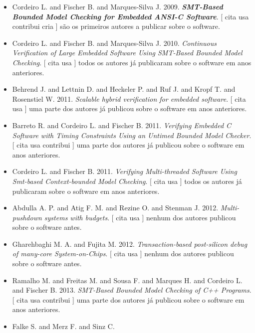 \begin{itemize}
\item Cordeiro L. and Fischer B. and Marques-Silva J.
      2009.
        \textbf{\textit{ SMT-Based Bounded Model Checking for Embedded ANSI-C Software}}.
      [
          cita
          usa
          contribui
          cria
      ]
são os primeiros autores a publicar sobre o software.
\item Cordeiro L. and Fischer B. and Marques-Silva J.
      2010.
        \textit{ Continuous Verification of Large Embedded Software Using SMT-Based Bounded Model Checking}.
      [
          cita
          usa
      ]
todos os autores já publicaram sobre o software em anos anteriores.
\item Behrend J. and Lettnin D. and Heckeler P. and Ruf J. and Kropf T. and Rosenstiel W.
      2011.
        \textit{ Scalable hybrid verification for embedded software}.
      [
          cita
          usa
      ]
uma parte dos autores já publicou sobre o software em anos anteriores.
\item Barreto R. and Cordeiro L. and Fischer B.
      2011.
        \textit{ Verifying Embedded C Software with Timing Constraints Using an Untimed Bounded Model Checker}.
      [
          cita
          usa
          contribui
      ]
uma parte dos autores já publicou sobre o software em anos anteriores.
\item Cordeiro L. and Fischer B.
      2011.
        \textit{ Verifying Multi-threaded Software Using Smt-based Context-bounded Model Checking}.
      [
          cita
          usa
      ]
todos os autores já publicaram sobre o software em anos anteriores.
\item Abdulla A. P. and Atig F. M. and Rezine O. and Stenman J.
      2012.
        \textit{ Multi-pushdown systems with budgets}.
      [
          cita
          usa
      ]
nenhum dos autores publicou sobre o software antes.
\item Gharehbaghi M. A. and Fujita M.
      2012.
        \textit{ Transaction-based post-silicon debug of many-core System-on-Chips}.
      [
          cita
          usa
      ]
nenhum dos autores publicou sobre o software antes.
\item Ramalho M. and Freitas M. and Sousa F. and Marques H. and Cordeiro L. and Fischer B.
      2013.
        \textit{ SMT-Based Bounded Model Checking of C++ Programs}.
      [
          cita
          usa
          contribui
      ]
uma parte dos autores já publicou sobre o software em anos anteriores.
\item Falke S. and Merz F. and Sinz C.

\end{itemize}
